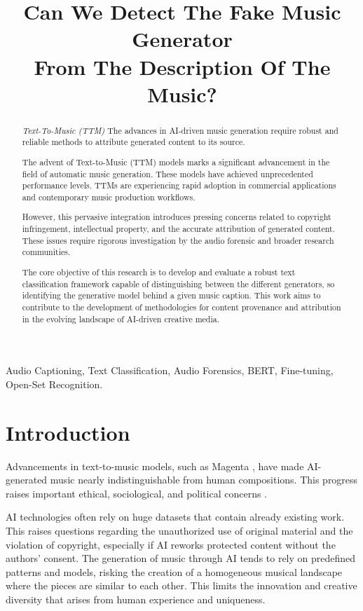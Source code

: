 \documentclass[conference]{IEEEtran}  %
\title{Can We Detect The Fake Music Generator\\ From The Description Of The Music?}
\author{
    \IEEEauthorblockN{Andrea Paglialunga, Alice Portentoso, Bian Lei}
    \IEEEauthorblockA{
        Dipartimento di Elettronica, Informazione e Bioingegneria (DEIB), Politecnico di Milano \\
        Music and Acoustic Engineering (MAE), Politecnico di Milano \\
        }
}
\begin{document}
\maketitle

\begin{abstract}
\textit{Text-To-Music (TTM)}
The advances in AI-driven music generation require robust and reliable methods to attribute generated content to its source. 

The advent of Text-to-Music (TTM) models marks a significant advancement in the field of automatic music generation. These models have achieved unprecedented performance levels.
TTMs are experiencing rapid adoption in commercial applications and contemporary music production workflows. 

However, this pervasive integration introduces pressing concerns related to copyright infringement, intellectual property, and the accurate attribution of generated content. These issues require rigorous investigation by the audio forensic and broader research communities.

The core objective of this research is to develop and evaluate a robust text classification framework capable of distinguishing between the different generators, so identifying the generative model behind a given music caption. This work aims to contribute to the development of methodologies for content provenance and attribution in the evolving landscape of AI-driven creative media.

\end{abstract}


\begin{IEEEkeywords}
Audio Captioning, Text Classification, Audio Forensics, BERT, Fine-tuning, Open-Set Recognition.
\end{IEEEkeywords}

\section{Introduction}
Advancements in text-to-music models, such as Magenta \cite{zhu2023surveyaimusicgeneration}, have made AI-generated music nearly indistinguishable from human compositions. This progress raises important ethical, sociological, and political concerns \cite{afchar2025aigeneratedmusicdetectionchallenges}.

AI technologies often rely on huge datasets that contain already existing work. This raises questions regarding the unauthorized use of original material and the violation of copyright, especially if AI reworks protected content without the authors' consent.
The generation of music through AI tends to rely on predefined patterns and models, risking the creation of a homogeneous musical landscape where the pieces are similar to each other. This limits the innovation and creative diversity that arises from human experience and uniqueness.
\end{document}
